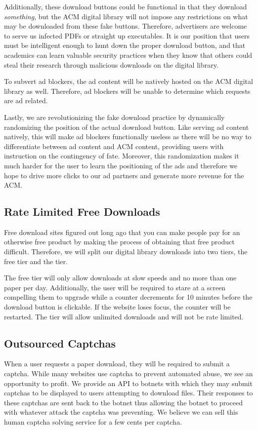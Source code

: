 Additionally, these download buttons could be functional in that they download
\textit{something}, but the ACM digital library will not impose any
restrictions on what may be downloaded from these fake buttons.
Therefore, advertisers are welcome to serve us infected PDFs or straight up
executables.
It is our position that users must be intelligent enough to hunt down the
proper download button, and that academics can learn valuable security
practices when they know that others could steal their research through
malicious downloads on the digital library.

To subvert ad blockers, the ad content will be natively hosted on the ACM
digital library as well.
Therefore, ad blockers will be unable to determine which requests are ad
related.

Lastly, we are revolutionizing the fake download practice by dynamically
randomizing the position of the actual download button.
Like serving ad content natively, this will make ad blockers functionally
useless as there will be no way to differentiate between ad content and ACM
content, providing users with instruction on the contingency of fate.
Moreover, this randomization makes it much harder for the user to learn the
positioning of the ads and therefore we hope to drive more clicks to our ad
partners and generate more revenue for the ACM.

\subsection{Rate Limited Free Downloads}
\label{sec:limit}
Free download sites figured out long ago that you can make people pay for an
otherwise free product by making the process of obtaining that free product
difficult.
Therefore, we will split our digital library downloads into two tiers, the free
tier and the \premium tier.

The free tier will only allow downloads at slow speeds and no more than one
paper per day.
Additionally, the user will be required to stare at a screen compelling them to
upgrade while a counter decrements for 10 minutes before the download button is
clickable.
If the website loses focus, the counter will be restarted.
The \premium tier will allow unlimited downloads and will not be rate limited.


\subsection{Outsourced Captchas}
When a user requests a paper download, they will be required to submit a
captcha.
While many websites use captcha to prevent automated abuse, we see an
opportunity to profit.
We provide an API to botnets with which they may submit captchas to be
displayed to users attempting to download files.
Their responses to these captchas are sent back to the botnet thus allowing the
botnet to proceed with whatever attack the captcha was preventing.
We believe we can sell this human captcha solving service for a few cents per
captcha.

